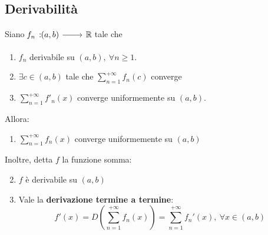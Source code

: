 \subsection{Derivabilità}
\begin{theorema}\label{derivabilitatermineatermine}
	Siano $\funz{f_n}{\left(a,b\right)}{\realset}$ tale che
	\begin{enumerate}[label=\alph*.]
		\item $f_n$ derivabile su $\left(a,b\right),\ \forall n\geq 1$.
		\item $\exists c\in\left(a,b\right)$ tale che $\displaystyle\sum_{n=1}^{+\infty}f_n\left(c\right)$ converge
		\item $\displaystyle\sum_{n=1}^{+\infty}f'_n(x)$ converge uniformemente su $\left(a,b\right)$.
	\end{enumerate}
Allora:
\begin{enumerate}
	\item $\displaystyle\sum_{n=1}^{+\infty}f_n(x)$ converge uniformemente su $\left(a,b\right)$
\end{enumerate}
Inoltre, detta $f$ la funzione somma:
\begin{enumerate}
		\setcounter{enumi}{1}
\item $f$ è derivabile su $\left(a,b\right)$
\item Vale la \textbf{derivazione termine a termine}:
\begin{equation}
	f'(x)=D\left(\sum_{n=1}^{+\infty}f_n(x)\right)=\sum_{n=1}^{+\infty}f_n'(x),\ \forall x\in\left(a,b\right)
\end{equation}
\end{enumerate}
\end{theorema}

